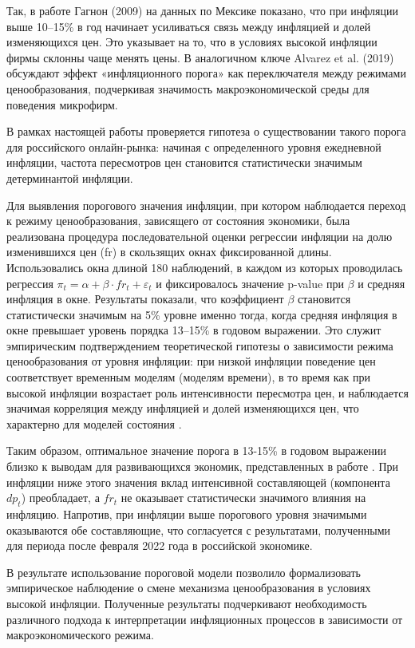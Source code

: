 Так, в работе Гагнон (2009) \cite{gagnon2009} на данных по Мексике показано, что при инфляции выше 10--15\% в год начинает усиливаться связь между инфляцией и долей изменяющихся цен. Это указывает на то, что в условиях высокой инфляции фирмы склонны чаще менять цены. В аналогичном ключе Alvarez et al. (2019) \cite{Alvarez2019} обсуждают эффект «инфляционного порога» как переключателя между режимами ценообразования, подчеркивая значимость макроэкономической среды для поведения микрофирм.

В рамках настоящей работы проверяется гипотеза о существовании такого порога для российского онлайн-рынка: начиная с определенного уровня ежедневной инфляции, частота пересмотров цен становится статистически значимым детерминантой инфляции. 

Для выявления порогового значения инфляции, при котором наблюдается переход к режиму ценообразования, зависящего от состояния экономики, была реализована процедура последовательной оценки регрессии инфляции на долю изменившихся цен (fr) в скользящих окнах фиксированной длины. Использовались окна длиной 180 наблюдений, в каждом из которых проводилась регрессия $\pi_t = \alpha + \beta \cdot fr_t + \varepsilon_t$ и фиксировалось значение p-value при $\beta$ и средняя инфляция в окне. Результаты показали, что коэффициент $\beta$ становится статистически значимым на 5\% уровне именно тогда, когда средняя инфляция в окне превышает уровень порядка 13–15\% в годовом выражении. Это служит эмпирическим подтверждением теоретической гипотезы о зависимости режима ценообразования от уровня инфляции: при низкой инфляции поведение цен соответствует временным моделям (моделям времени), в то время как при высокой инфляции возрастает роль интенсивности пересмотра цен, и наблюдается значимая корреляция между инфляцией и долей изменяющихся цен, что характерно для моделей состояния \cite{caplin1987, Dotsey1999, golosov2007}.

Таким образом, оптимальное значение порога в 13-15\% в годовом выражении близко к выводам для развивающихся экономик, представленных в работе \cite{gagnon2009}. При инфляции ниже этого значения вклад интенсивной составляющей (компонента $\textit{dp}_{t}$)  преобладает, а $fr_t$ не оказывает статистически значимого влияния на инфляцию. Напротив, при инфляции выше порогового уровня значимыми оказываются обе составляющие, что согласуется с результатами, полученными для периода после февраля 2022 года в российской экономике. 

В результате использование пороговой модели позволило формализовать эмпирическое наблюдение о смене механизма ценообразования в условиях высокой инфляции. Полученные результаты подчеркивают необходимость различного подхода к интерпретации инфляционных процессов в зависимости от макроэкономического режима.



